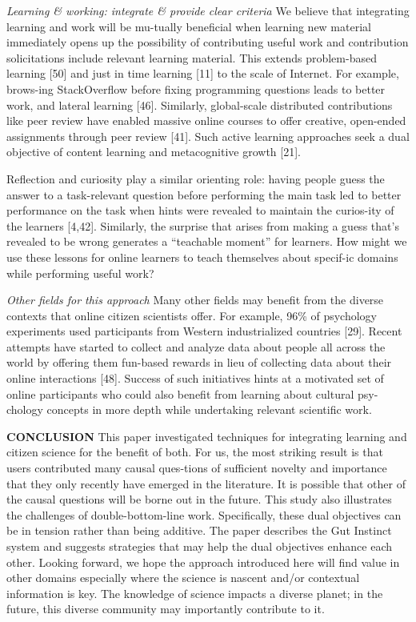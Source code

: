 \textit{Learning \& working: integrate \& provide clear criteria}
We believe that integrating learning and work will be mu-tually beneficial when learning new material immediately opens up the possibility of contributing useful work and contribution solicitations include relevant learning material. This extends problem-based learning [50] and just in time learning [11] to the scale of Internet. For example, brows-ing StackOverflow before fixing programming questions leads to better work, and lateral learning [46]. Similarly, global-scale distributed contributions like peer review have enabled massive online courses to offer creative, open-ended assignments through peer review [41]. Such active learning approaches seek a dual objective of content learning and metacognitive growth [21].
 
Reflection and curiosity play a similar orienting role: having people guess the answer to a task-relevant question before performing the main task led to better performance on the task when hints were revealed to maintain the curios-ity of the learners [4,42]. Similarly, the surprise that arises from making a guess that’s revealed to be wrong generates a “teachable moment” for learners. How might we use these lessons for online learners to teach themselves about specif-ic domains while performing useful work? 

\textit{Other fields for this approach}
Many other fields may benefit from the diverse contexts that online citizen scientists offer. For example, 96\% of psychology experiments used participants from Western industrialized countries [29]. Recent attempts have started to collect and analyze data about people all across the world by offering them fun-based rewards in lieu of collecting data about their online interactions [48]. Success of such initiatives hints at a motivated set of online participants who could also benefit from learning about cultural psy-chology concepts in more depth while undertaking relevant scientific work. 

\textbf{CONCLUSION}
This paper investigated techniques for integrating learning and citizen science for the benefit of both. For us, the most striking result is that users contributed many causal ques-tions of sufficient novelty and importance that they only recently have emerged in the literature. It is possible that other of the causal questions will be borne out in the future. This study also illustrates the challenges of double-bottom-line work. Specifically, these dual objectives can be in tension rather than being additive. The paper describes the Gut Instinct system and suggests strategies that may help the dual objectives enhance each other. Looking forward, we hope the approach introduced here will find value in other domains especially where the science is nascent and/or contextual information is key. The knowledge of science impacts a diverse planet; in the future, this diverse community may importantly contribute to it.



